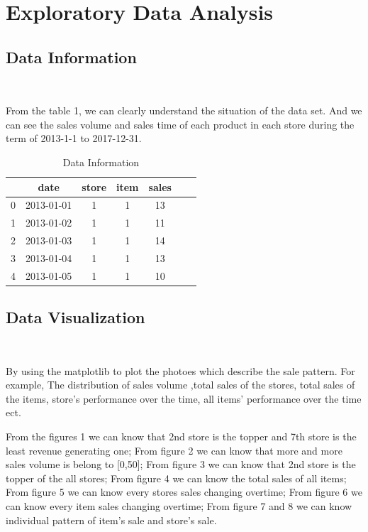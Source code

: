 \section{Exploratory Data Analysis} \label{sec-data_exploration}

\subsection{Data Information}
\

From the table 1, we can clearly understand the situation of the 
data set. And we can see the sales volume and sales time of each 
product in each store during the term of 2013-1-1 to 2017-12-31.

\begin{table}[htbp]  \centering
	\caption{Data Information}
	\label{tbl:data information}
	\begin{tabular}{ccccccc}
		\hline
		& date & store & item & sales\\
		\hline
		0 & 2013-01-01 & 1 & 1 & 13 \\
	  1 & 2013-01-02 & 1 & 1 & 11 \\
		2 & 2013-01-03 & 1 & 1 & 14 \\
		3 & 2013-01-04 & 1 & 1 & 13 \\
	  4 & 2013-01-05 & 1 & 1 & 10 \\
		\hline 
	\end{tabular}
\end{table}

\subsection{Data Visualization}
\

By using the matplotlib to plot the photoes which describe the
sale pattern. For example, The distribution of sales volume ,total 
sales of the stores, total sales of the items, store’s performance 
over the time, all items’ performance over the time ect.

From the figures 1 we can know that 2nd store is the topper and
7th store is the least revenue generating one; From figure 2 we can
know that more and more sales volume is belong to [0,50]; From figure 
3 we can know that 2nd store is the topper of the all stores; From
figure 4 we can know the total sales of all items; From figure 5 we 
can know every stores sales changing overtime; From figure 6 we can
know every item sales changing overtime; From figure 7 and 8 we can 
know individual pattern of item’s sale and store’s sale.

